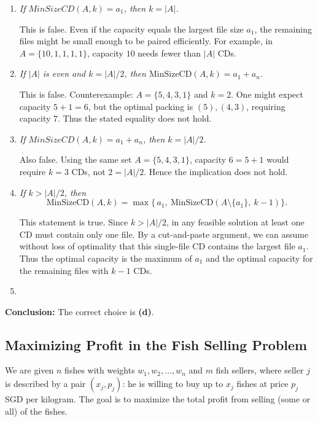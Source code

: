 \documentclass[9pt]{extarticle}
\begin{document}
\begin{enumerate}

\item 
\emph{If \(MinSizeCD(A,k) = a_1\), then \(k = |A|\).}

This is false. Even if the capacity equals the largest file size \(a_1\), 
the remaining files might be small enough to be paired efficiently.
For example, in 
\(A = \{10,1,1,1,1\}\),
capacity \(10\) needs fewer than \(|A|\) CDs.

\item 
\emph{If \(|A|\) is even and \(k = |A|/2\), then \(\mathrm{MinSizeCD}(A,k) = a_1 + a_n\).}

This is false.  
Counterexample:
\(
A = \{5,4,3,1\}
\)
and \(k = 2\).
One might expect capacity \(5+1 = 6\), but the optimal packing is
\((5),(4,3)\), requiring capacity \(7\).  
Thus the stated equality does not hold.

\item 
\emph{If $MinSizeCD(A,k) = a_1 + a_n$, then \(k = |A|/2\).}

Also false.  
Using the same set 
\(A = \{5,4,3,1\}\), 
capacity \(6 = 5+1\) would require \(k = 3\) CDs, not \(2 = |A|/2\).
Hence the implication does not hold.

\item 
\emph{If \(k > |A|/2\), then}
\[
\mathrm{MinSizeCD}(A,k)
= \max\{\,a_1,\ \mathrm{MinSizeCD}(A \setminus \{a_1\},\ k-1)\}.
\]

This statement is true.  
Since \(k > |A|/2\), in any feasible solution at least one CD must contain only one file.  
By a cut-and-paste argument, we can assume without loss of optimality that this single-file CD contains the largest file \(a_1\).  
Thus the optimal capacity is the maximum of \(a_1\) and the optimal capacity for the remaining files with \(k-1\) CDs.

\item 
\end{enumerate}

\noindent
\textbf{Conclusion:} The correct choice is \textbf{(d)}.
\subsection{Maximizing Profit in the Fish Selling Problem}

We are given \(n\) fishes with weights \(w_1, w_2, \ldots, w_n\) and \(m\) fish sellers,
where seller \(j\) is described by a pair \((x_j, p_j)\): he is willing to buy up to
\(x_j\) fishes at price \(p_j\) SGD per kilogram. The goal is to maximize the total
profit from selling (some or all) of the fishes.
\end{document}

